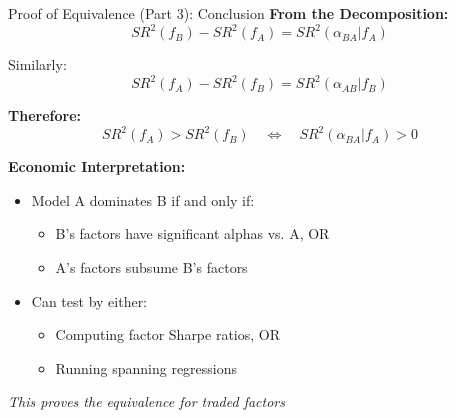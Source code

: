 \documentclass{beamer}
\begin{document}
\begin{frame}{Proof of Equivalence (Part 3): Conclusion}
    \textbf{From the Decomposition:}
    \begin{equation*}
        SR^2(f_B) - SR^2(f_A) = SR^2(\alpha_{BA} | f_A)
    \end{equation*}
    
    Similarly:
    \begin{equation*}
        SR^2(f_A) - SR^2(f_B) = SR^2(\alpha_{AB} | f_B)
    \end{equation*}
    
    \vspace{0.3cm}
    \textbf{Therefore:}
    \begin{equation*}
        SR^2(f_A) > SR^2(f_B) \quad \Leftrightarrow \quad SR^2(\alpha_{BA} | f_A) > 0
    \end{equation*}
    
    
    \textbf{Economic Interpretation:}
    \begin{itemize}
        \item Model A dominates B if and only if:
        \begin{itemize}
            \item B's factors have significant alphas vs. A, OR
            \item A's factors subsume B's factors
        \end{itemize}
        \item Can test by either:
        \begin{itemize}
            \item Computing factor Sharpe ratios, OR
            \item Running spanning regressions
        \end{itemize}
    \end{itemize}
    
    
    \textit{This proves the equivalence for traded factors}
\end{frame}
\end{document}
